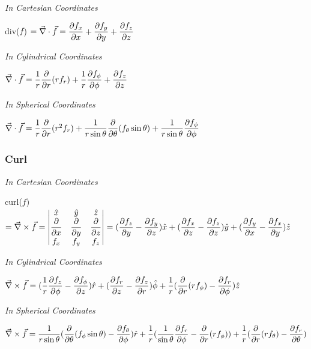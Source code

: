 \textit{In Cartesian Coordinates}
\begin{itemize}
\itemt div($f$) \( = \vec{\nabla}\cdot{\vec{f}} = \dfrac{\partial f_x}{\partial x} + \dfrac{\partial f_y}{\partial y} + \dfrac{\partial f_z}{\partial z} \)
\end{itemize}

\textit{In Cylindrical Coordinates}
\begin{itemize}
\itemt\( \vec{\nabla}\cdot{\vec{f}} = \dfrac{1}{r}\dfrac{\partial }{\partial r}(rf_r) + \dfrac{1}{r}\dfrac{\partial f_\phi}{\partial \phi} + \dfrac{\partial f_z}{\partial z} \)
\end{itemize}

\textit{In Spherical Coordinates}
\begin{itemize}
\itemt\( \vec{\nabla}\cdot{\vec{f}} = \dfrac{1}{r}\dfrac{\partial }{\partial r}(r^2f_r) + \dfrac{1}{r\sin\theta}\dfrac{\partial }{\partial \theta}(f_\theta \sin\theta) + \dfrac{1}{r\sin\theta}\dfrac{\partial f_\phi}{\partial \phi} \)
\end{itemize}

\subsubsection{Curl}
\def\arraystretch{1.5}
\textit{\hspace*{0.4cm} In Cartesian Coordinates}
\begin{itemize}
\itemt curl($f$) \( = \vec{\nabla}\times\vec{f} = 
\begin{vmatrix}
\hat{x} 	& \hat{y} 		& \hat{z} \\
\dfrac{\partial }{\partial x} & \dfrac{\partial }{\partial y} 	& \dfrac{\partial }{\partial z} \\
f_x			& f_y 			& f_z
\end{vmatrix}        
	= (\dfrac{\partial f_z}{\partial y} - \dfrac{\partial f_y}{\partial z})\hat{x} + (\dfrac{\partial f_x}{\partial z} - \dfrac{\partial f_z}{\partial z})\hat{y} + (\dfrac{\partial f_y}{\partial x} - \dfrac{\partial f_x}{\partial y})\hat{z} \)
\end{itemize}

\textit{In Cylindrical Coordinates}
\begin{itemize}
\itemt \( \vec{\nabla}\times\vec{f} = (\dfrac{1}{r} \dfrac{\partial f_z}{\partial \phi} - \dfrac{\partial f_\phi}{\partial z})\hat{r} + (\dfrac{\partial f_r}{\partial z} - \dfrac{\partial f_z}{\partial r})\hat{\phi} + \dfrac{1}{r} (\dfrac{\partial }{\partial r} (r f_\phi) - \dfrac{\partial f_r}{\partial \phi})\hat{z} \)
\end{itemize}

\textit{In Spherical Coordinates}                
\begin{itemize}
\itemt \( \vec{\nabla}\times\vec{f} = \dfrac{1}{r\sin\theta} (\dfrac{\partial }{\partial \theta} (f_\phi \sin\theta) - \dfrac{\partial f_\theta}{\partial \phi})\hat{r} + \dfrac{1}{r}(\dfrac{1}{\sin\theta} \dfrac{\partial f_r}{\partial \phi} - \dfrac{\partial }{\partial r} (rf_\phi)) + \dfrac{1}{r}(\dfrac{\partial }{\partial r}(rf_\theta) - \dfrac{\partial f_r}{\partial \theta})\)
\end{itemize}


